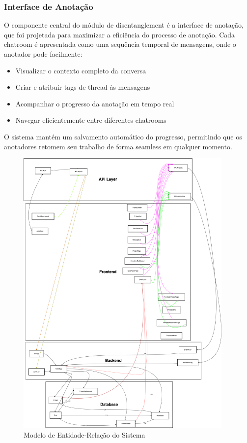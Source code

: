 \subsubsection{Interface de Anotação}
O componente central do módulo de disentanglement é a interface de anotação, que foi projetada para maximizar a eficiência do processo de anotação. Cada chatroom é apresentada como uma sequência temporal de mensagens, onde o anotador pode facilmente:
\begin{itemize}
    \item Visualizar o contexto completo da conversa
    \item Criar e atribuir tags de thread às mensagens
    \item Acompanhar o progresso da anotação em tempo real
    \item Navegar eficientemente entre diferentes chatrooms
\end{itemize}

O sistema mantém um salvamento automático do progresso, permitindo que os anotadores retomem seu trabalho de forma seamless em qualquer momento.


\begin{figure}[p]
    \centering
    \includegraphics[width=0.95\textwidth,height=0.95\textheight,keepaspectratio]{images/2A-ERT-B.drawio.png}
    \caption{Modelo de Entidade-Relação do Sistema}
    \label{fig:modelo-er}
\end{figure}

